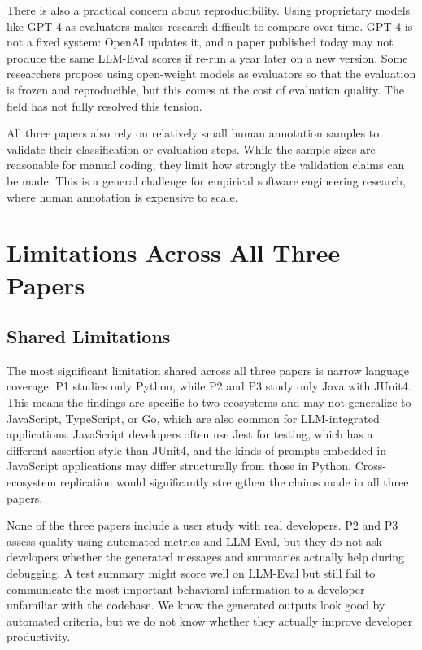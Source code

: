 \documentclass[
    pdftex,
    final,
    11pt,
    a4paper,
    parskip=false,
    oneside,
    footheight=0mm,
    footinclude=false,
    toc=bibliography
]{scrbook}
\begin{document}
There is also a practical concern about reproducibility. Using proprietary models like GPT-4 as evaluators makes research difficult to compare over time. GPT-4 is not a fixed system: OpenAI updates it, and a paper published today may not produce the same LLM-Eval scores if re-run a year later on a new version. Some researchers propose using open-weight models as evaluators so that the evaluation is frozen and reproducible, but this comes at the cost of evaluation quality. The field has not fully resolved this tension.

All three papers also rely on relatively small human annotation samples to validate their classification or evaluation steps. While the sample sizes are reasonable for manual coding, they limit how strongly the validation claims can be made. This is a general challenge for empirical software engineering research, where human annotation is expensive to scale.

\section{Limitations Across All Three Papers}

\subsection{Shared Limitations}

The most significant limitation shared across all three papers is narrow language coverage. P1 studies only Python, while P2 and P3 study only Java with JUnit4. This means the findings are specific to two ecosystems and may not generalize to JavaScript, TypeScript, or Go, which are also common for LLM-integrated applications. JavaScript developers often use Jest for testing, which has a different assertion style than JUnit4, and the kinds of prompts embedded in JavaScript applications may differ structurally from those in Python. Cross-ecosystem replication would significantly strengthen the claims made in all three papers.

None of the three papers include a user study with real developers. P2 and P3 assess quality using automated metrics and LLM-Eval, but they do not ask developers whether the generated messages and summaries actually help during debugging. A test summary might score well on LLM-Eval but still fail to communicate the most important behavioral information to a developer unfamiliar with the codebase. We know the generated outputs look good by automated criteria, but we do not know whether they actually improve developer productivity.
\end{document}
